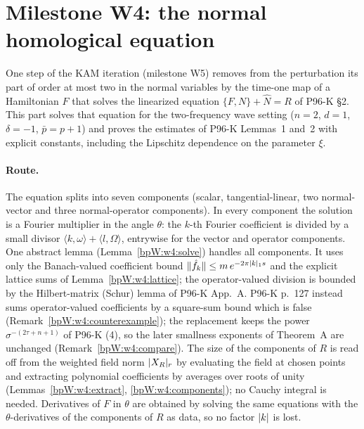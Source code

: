 \section{Milestone W4: the normal homological equation}\label{bpW:w4}

One step of the KAM iteration (milestone W5) removes from the perturbation its part of order at most two in the
normal variables by the time-one map of a Hamiltonian $F$ that solves the linearized equation
$\{F,N\}+\hat N=R$ of P96-K \S2. This part solves that equation for the two-frequency wave setting ($n=2$,
$d=1$, $\delta=-1$, $\bar p=p+1$) and proves the estimates of P96-K Lemmas~1 and~2 with explicit constants, including
the Lipschitz dependence on the parameter $\xi$.

\paragraph{Route.} The equation splits into seven components (scalar, tangential-linear, two normal-vector and three
normal-operator components). In every component the solution is a Fourier multiplier in the angle $\theta$: the
$k$-th Fourier coefficient is divided by a small divisor $\langle k,\omega\rangle+\langle l,\Omega\rangle$, entrywise
for the vector and operator components. One abstract lemma (Lemma~\ref{bpW:w4:solve}) handles all components. It
uses only the Banach-valued coefficient bound $\lVert \hat f_k\rVert\le m\,e^{-2\pi\lvert k\rvert_1s}$ and the explicit lattice
sums of Lemma~\ref{bpW:w4:lattice}; the operator-valued division is bounded by the Hilbert-matrix (Schur) lemma of
P96-K App.~A. P96-K p.~127 instead sums operator-valued coefficients by a square-sum bound which is false
(Remark~\ref{bpW:w4:counterexample}); the replacement keeps the power $\sigma^{-(2\tau+n+1)}$ of P96-K (4), so the
later smallness exponents of Theorem~A are unchanged (Remark~\ref{bpW:w4:compare}). The size of the components
of $R$ is read off from the weighted field norm $\lvert X_R\rvert_r$ by evaluating the field at chosen points and
extracting polynomial coefficients by averages over roots of unity (Lemmas~\ref{bpW:w4:extract},
\ref{bpW:w4:components}); no Cauchy integral is needed. Derivatives of $F$ in $\theta$ are obtained by solving the
same equations with the $\theta$-derivatives of the components of $R$ as data, so no factor $\lvert k\rvert$ is lost.

